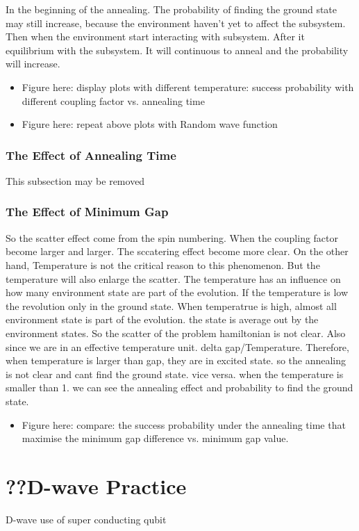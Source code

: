 \documentclass[twoside,a4paper,article]{combine}
\begin{document}
	In the beginning of the annealing. The probability of finding the ground state may still increase, because the environment haven't yet to affect the subsystem. Then when the environment start interacting with subsystem. After it equilibrium with the subsystem. It will continuous to anneal and the probability will increase. 
	\begin{itemize}
		\item \checkmark Figure here: display plots with different temperature: success probability with different coupling factor vs. annealing time
		
		\item \checkmark Figure here: repeat above plots with Random wave function
	\end{itemize}
	
	
\subsubsection{The Effect of Annealing Time}
	This subsection may be removed 
\subsubsection{The Effect of Minimum Gap}
	So the scatter effect come from the spin numbering. When the coupling factor become larger and larger. The sccatering effect become more clear. On the other hand, Temperature is not the critical reason to this phenomenon. But the temperature will also enlarge the scatter. The temperature has an influence on how many environment state are part of the evolution. If the temperature is low the revolution only in the ground state. When temperatrue is high, almost all environment state is part of the evolution. the state is average out by the environment states. So the scatter of the problem hamiltonian is not clear. Also since we are in an effective temperature unit. delta gap/Temperature. Therefore, when temperature is larger than gap, they are in excited state. so the annealing is not clear and cant find the ground state. vice versa. when the temperature is smaller than 1. we can see the annealing effect and probability to find the ground state. 
	\begin{itemize}
		\item \checkmark Figure here: compare: the success probability under the annealing time that maximise the minimum gap difference vs. minimum gap value.
	\end{itemize}
\section{??D-wave Practice}
	\cite{Johnson2011}
	D-wave use of super conducting qubit
	
\end{document}
